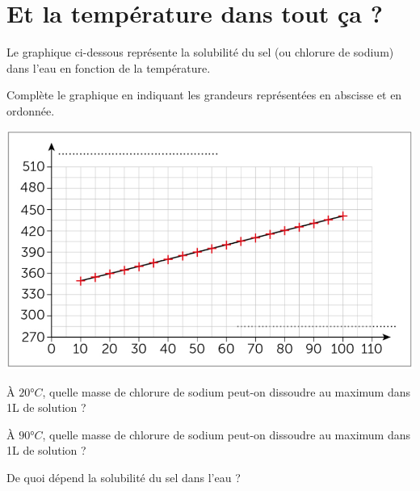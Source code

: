 \section{Et la température dans tout ça ?}

Le graphique ci-dessous représente la solubilité du  sel (ou chlorure de sodium) dans l'eau en fonction de la température.

\begin{questions}
	\question Complète le graphique en indiquant les grandeurs représentées en abscisse et en ordonnée.
	
	\begin{center}
		\includegraphics[scale=0.5]{img/courbe}
	\end{center}

	\question \`A $20 °C$, quelle masse de chlorure de sodium peut-on dissoudre au maximum dans 1L de solution ?
	
	\question \`A $90 °C$, quelle masse de chlorure de sodium peut-on dissoudre au maximum dans 1L de solution ?
	
	\question De quoi dépend la solubilité du sel dans l'eau ?
\end{questions}
